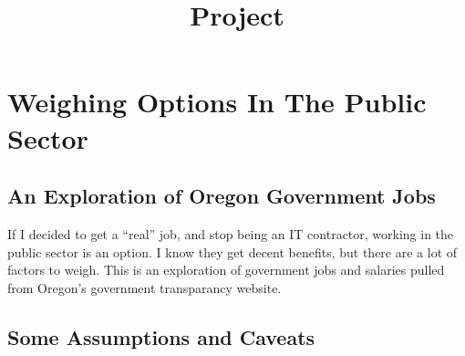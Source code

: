 \documentclass[11pt]{article}
\title{Project}
\begin{document}
    
    \maketitle
    
    

    
    \hypertarget{weighing-options-in-the-public-sector}{%
\section{Weighing Options In The Public
Sector}\label{weighing-options-in-the-public-sector}}

\hypertarget{an-exploration-of-oregon-government-jobs}{%
\subsection{An Exploration of Oregon Government
Jobs}\label{an-exploration-of-oregon-government-jobs}}

If I decided to get a ``real'' job, and stop being an IT contractor,
working in the public sector is an option. I know they get decent
benefits, but there are a lot of factors to weigh. This is an
exploration of government jobs and salaries pulled from Oregon's
government transparancy website.

\hypertarget{some-assumptions-and-caveats}{%
\subsection{Some Assumptions and
Caveats}\label{some-assumptions-and-caveats}}
\end{document}

